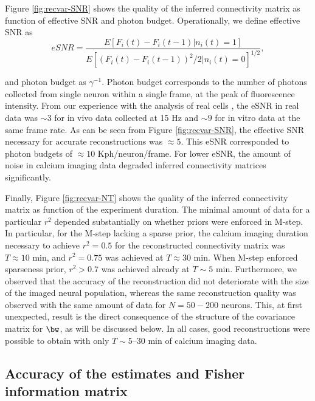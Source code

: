 Figure \ref{fig:recvar-SNR} shows the quality of the inferred connectivity matrix as function of effective SNR and photon budget. Operationally, we define effective SNR as
\begin{equation}
eSNR=\frac{E[F_i(t)-F_i(t-1)|n_i(t)=1]}{E[{(F_i(t)-F_i(t-1))^2}/{2}|n_i(t)=0]^{1/2}},
\end{equation}

\noindent and photon budget as $\gamma^{-1}$. Photon budget corresponds to the number of photons collected from single neuron within a single frame, at the peak of fluorescence intensity. From our experience with the analysis of real cells \cite{Vogelstein2009}, the eSNR in real data was $\sim 3$ for in vivo data collected at 15  Hz and $\sim 9$  for in vitro data at the same frame rate. As can be seen from Figure \ref{fig:recvar-SNR}, the effective SNR necessary for accurate reconstructions was $\approx 5$. This eSNR corresponded to photon budgets of $\approx 10$ Kph/neuron/frame.
For lower eSNR, the amount of noise in calcium imaging data degraded inferred connectivity matrices significantly.

Finally, Figure \ref{fig:recvar-NT} shows the quality of the inferred connectivity matrix as function of the experiment duration. The minimal amount of data for a particular $r^2$ depended substantially on whether priors were enforced in M-step. In particular, for the M-step lacking a sparse prior, the calcium imaging duration necessary to achieve $r^2=0.5$ for the reconstructed connectivity matrix was $T\approx 10$ min, and $r^2=0.75$ was achieved at $T\approx 30$ min. When M-step enforced sparseness prior, $r^2>0.7$ was achieved already at $T\sim 5$ min. Furthermore, we observed that the accuracy of the reconstruction did not deteriorate with the size of the imaged neural population, whereas the same reconstruction quality was observed with the same amount of data for $N=50-200$ neurons.
This, at first unexpected, result is the direct consequence of the structure of the covariance matrix for $\bw$, as will be discussed below.
In all cases, good reconstructions were possible to obtain with only $T\sim 5$--$30$ min of calcium imaging data.


\subsection{Accuracy of the estimates and Fisher information matrix} \label{sec:methods:accuracy_Fisher}

